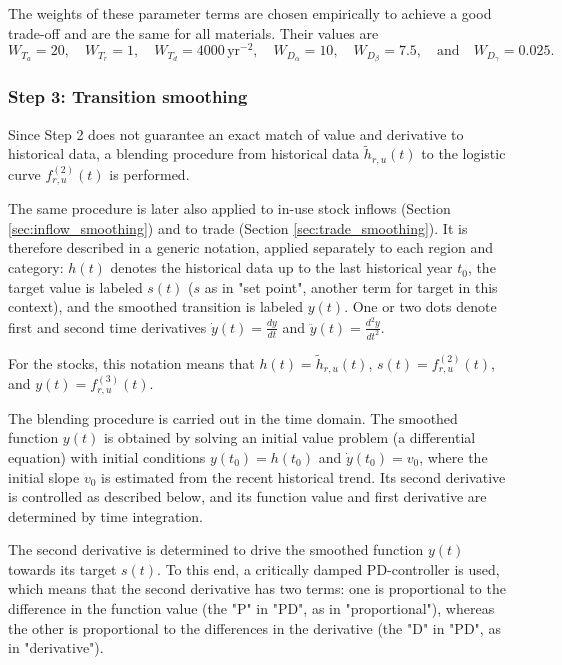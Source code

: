The weights of these parameter terms are chosen empirically to achieve a good trade-off and are the same for all materials. Their values are
\begin{equation}
W_{T_a} = 20, \quad
W_{T_r} = 1, \quad
W_{T_d} = 4000\, \text{yr}^{-2}, \quad
W_{D_\alpha} = 10, \quad
W_{D_\beta} = 7.5, \quad \text{and} \quad
W_{D_\gamma} = 0.025.
\end{equation}

\subsubsection{Step 3: Transition smoothing} \label{sec:smoothing}

Since Step 2 does not guarantee an exact match of value and derivative to historical data, a blending procedure from historical data $\tilde{h}_{r,u}(t)$ to the logistic curve $f^{(2)}_{r,u}(t)$ is performed.

The same procedure is later also applied to in-use stock inflows (Section \ref{sec:inflow_smoothing}) and to trade (Section \ref{sec:trade_smoothing}). It is therefore described in a generic notation, applied separately to each region and category: $h(t)$ denotes the historical data up to the last historical year $t_{0}$, the target value is labeled $s(t)$ ($s$ as in "set point", another term for target in this context), and the smoothed transition is labeled $y(t)$. One or two dots denote first and second time derivatives $\dot{y}(t) = \frac{dy}{d t}$ and $\ddot{y}(t) = \frac{d^2y}{d t^2}$.

For the stocks, this notation means that $h(t) = \tilde{h}_{r,u}(t)$, $s(t) = f^{(2)}_{r,u}(t)$, and $y(t) = f^{(3)}_{r,u}(t)$.

The blending procedure is carried out in the time domain. The smoothed function $y(t)$ is obtained by solving an initial value problem (a differential equation) with initial conditions $y(t_{0}) = h(t_{0})$ and $\dot{y}(t_{0}) = v_0$, where the initial slope $v_0$ is estimated from the recent historical trend. Its second derivative is controlled as described below, and its function value and first derivative are determined by time integration.

The second derivative is determined to drive the smoothed function $y(t)$ towards its target $s(t)$. To this end, a critically damped PD-controller is used, which means that the second derivative has two terms: one is proportional to the difference in the function value (the "P" in "PD", as in "proportional"), whereas the other is proportional to the differences in the derivative (the "D" in "PD", as in "derivative").


